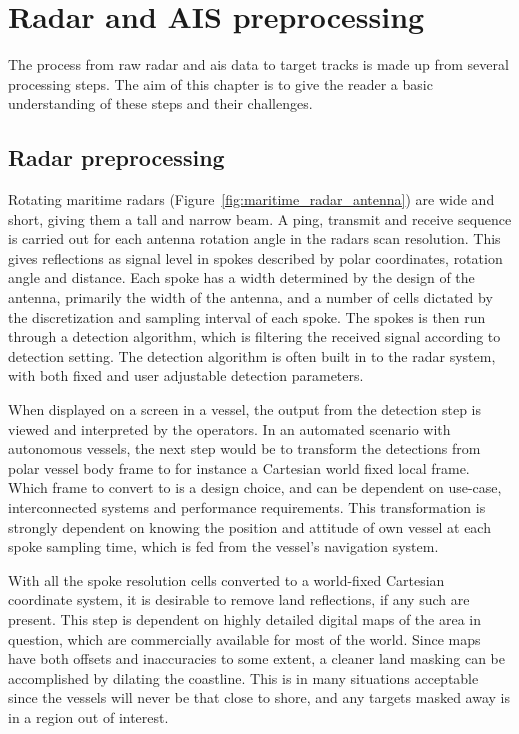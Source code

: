 
\chapter{Radar and AIS preprocessing}\label{chapter:radar-and-ais-preprocessing}
The process from raw radar and \gls{ais} data to target tracks is made up from several processing steps. The aim of this chapter is to give the reader a basic understanding of these steps and their challenges.

\section{Radar preprocessing}\label{sec:radar_preprocessing}
Rotating maritime radars (Figure~\ref{fig:maritime_radar_antenna}) are wide and short, giving them a tall and narrow beam. A ping, transmit and receive sequence is carried out for each antenna rotation angle in the radars scan resolution. This gives reflections as signal level in spokes described by polar coordinates, rotation angle and distance. Each spoke has a width determined by the design of the antenna, primarily the width of the antenna, and a number of cells dictated by the discretization and sampling interval of each spoke. The spokes is then run through a detection algorithm, which is filtering the received signal according to detection setting. The detection algorithm is often built in to the radar system, with both fixed and user adjustable detection parameters.

When displayed on a screen in a vessel, the output from the detection step is viewed and interpreted by the operators. In an automated scenario with autonomous vessels, the next step would be to transform the detections from polar vessel body frame to for instance a Cartesian world fixed local frame. Which frame to convert to is a design choice, and can be dependent on use-case, interconnected systems and performance requirements. This transformation is strongly dependent on knowing the position and attitude of own vessel at each spoke sampling time, which is fed from the vessel's navigation system.

With all the spoke resolution cells converted to a world-fixed Cartesian coordinate system, it is desirable to remove land reflections, if any such are present. This step is dependent on highly detailed digital maps of the area in question, which are commercially available for most of the world. Since maps have both offsets and inaccuracies to some extent, a cleaner land masking can be accomplished by dilating the coastline. This is in many situations acceptable since the vessels will never be that close to shore, and any targets masked away is in a region out of interest.

